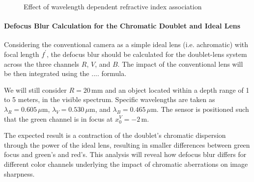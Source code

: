\documentclass[10pt,letterpaper]{article}
\begin{document}
\begin{figure}[h]
    \centering
	\caption{Effect of wavelength dependent refractive index association}
\end{figure}


\paragraph{Defocus Blur Calculation for the Chromatic Doublet and Ideal Lens\\}

Considering the conventional camera as a simple ideal lens (i.e. achromatic) with focal length \(f^{\prime}\), the defocus blur should be calculated for the doublet-lens system across the three channels \(R\), \(V\), and \(B\). The impact of the conventional lens will be then integrated using the .... formula.

We will still consider \(R = 20 \, \text{mm}\) and an object located within a depth range of 1 to 5 meters, in the visible spectrum. Specific wavelengths are taken as \(\lambda_R = 0.605 \, \mu \mathrm{m}\), \(\lambda_V = 0.530 \, \mu \mathrm{m}\), and \(\lambda_B = 0.465 \, \mu \mathrm{m}\). The sensor is positioned such that the green channel is in focus at \(x_0^V = -2 \, \text{m}\).

The expected result is a contraction of the doublet's chromatic dispersion through the power of the ideal lens, resulting in smaller differences between green focus and green's and red's. This analysis will reveal how defocus blur differs for different color channels underlying the impact of chromatic aberrations on image sharpness.
\end{document}
